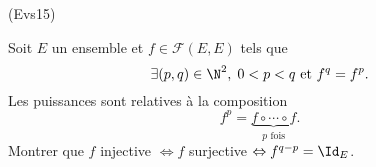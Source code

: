 \begin{tiny}(Evs15)\end{tiny} Soit $E$ un ensemble et $f\in \mathcal{F}(E,E)$ tels que
\begin{displaymath}
\exists (p,q)\in \N^2, \; 0 < p < q \text{ et } f^q = f^p.
\end{displaymath}
Les puissances sont relatives à la composition
\begin{displaymath}
 f^p = \underset{p \text{ fois}}{\underbrace{f\circ \cdots \circ f}}.
\end{displaymath}
Montrer que $f$ injective $\Leftrightarrow f$ surjective $\Leftrightarrow f^{q-p} = \Id_E$.
